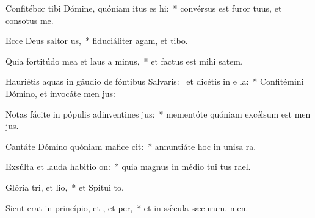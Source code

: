\item Confitébor tibi Dómine, quóniam itus es hi:~* convérsus est furor tuus, et consotus  me.
\item Ecce Deus saltor us,~* fiduciáliter agam, et  tibo.
\item Quia fortitúdo mea et laus a minus,~* et factus est mihi  satem.
\item Hauriétis aquas in gáudio de fóntibus Salvaris:~\pscross{} et dicétis in e la:~* Confitémini Dómino, et invocáte men jus:
\item Notas fácite in pópulis adinventines jus:~* mementóte quóniam excélsum est men jus.
\item Cantáte Dómino quóniam mafice cit:~* annuntiáte hoc in unisa ra.
\item Exsúlta et lauda habitio on:~* quia magnus in médio tui tus rael.
\item Glória tri, et lio,~* et Spitui to.
\item Sicut erat in princípio, et , et per,~* et in sǽcula sæcurum. men.
